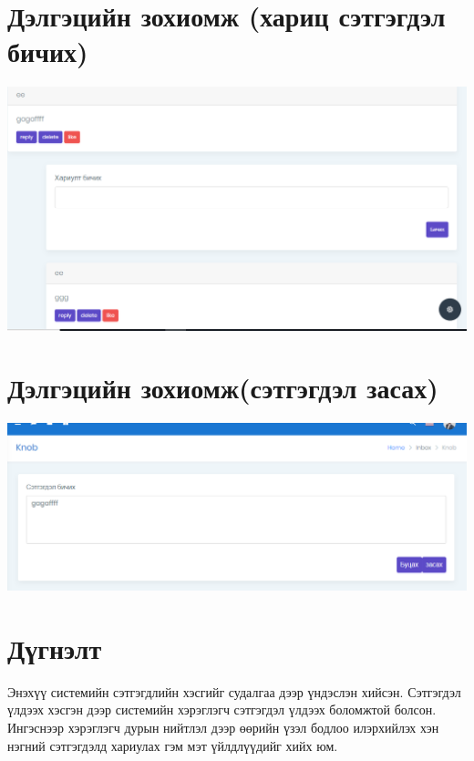 \documentclass[12pt]{article}
\begin{document}
\section{Дэлгэцийн зохиомж (хариц сэтгэгдэл бичих) }
\includegraphics[scale=0.5]{soyoloo2}
\section{Дэлгэцийн зохиомж(сэтгэгдэл засах)}
\includegraphics[scale=0.5]{soyoloo3}



\section{Дүгнэлт}
	\begin{itemize}
		Энэхүү системийн сэтгэгдлийн хэсгийг судалгаа дээр үндэслэн хийсэн. Сэтгэгдэл үлдээх хэсгэн дээр системийн хэрэглэгч сэтгэгдэл үлдээх боломжтой болсон. Ингэснээр хэрэглэгч дурын нийтлэл дээр өөрийн үзэл бодлоо илэрхийлэх хэн нэгний сэтгэгдэлд хариулах гэм мэт үйлдлүүдийг хийх юм. 
	
		 \end{itemize}

	  

   	
\end{document}
